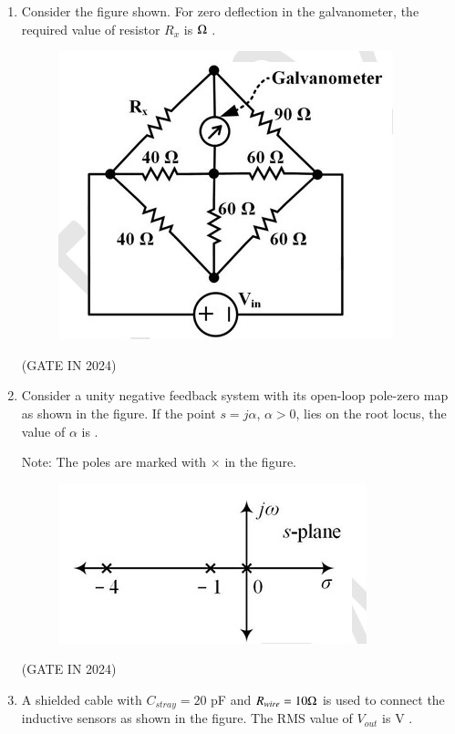 \documentclass[journal,12pt,onecolumn]{IEEEtran}
\theoremstyle{remark}
\begin{document}
\begin{enumerate}
    \item Consider the figure shown.  For zero deflection in the galvanometer, the required value of resistor $R_x$ is \underline{\hspace{2cm}} $\ohm$ .
    \begin{figure}[H]
        \centering
        \includegraphics[width=0.5\columnwidth]{figs/p28.jpg}
        \caption*{}
        \label{fig:p28}
    \end{figure}
    
    \hfill{(GATE IN 2024)}
    
    \item Consider a unity negative feedback system with its open-loop pole-zero map as shown in the figure.  If the point $s = j\alpha$, $\alpha > 0$, lies on the root locus, the value of $\alpha$ is \underline{\hspace{2cm}} .
    
    Note: The poles are marked with $\times$ in the figure.
    \begin{figure}[H]
        \centering
        \includegraphics[width=0.7\columnwidth]{figs/p29.jpg}
        \caption*{}
        \label{fig:p29}
    \end{figure}
    
    \hfill{(GATE IN 2024)}
    
    \item A shielded cable with $C_{stray} = 20$ pF and $R_{wire} = 10 \ohm$ is used to connect the inductive sensors as shown in the figure.  The RMS value of $V_{out}$ is \underline{\hspace{2cm}} V .
    

\end{enumerate}
\end{document}
